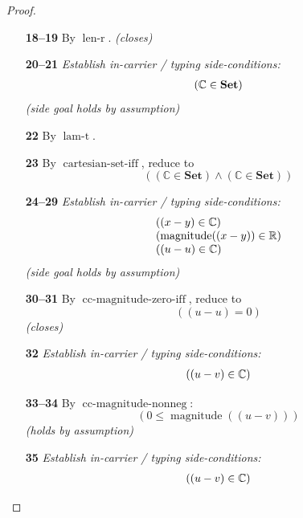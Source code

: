 \documentclass[11pt]{article}
\theoremstyle{plain}
\begin{document}
\begin{proof}
\begin{itemize}[leftmargin=2.8em, itemsep=4pt, parsep=1pt]
  \item[\textbf{18--19}] By $\operatorname{len\text{-}r}$.  \emph{(closes)}
  \item[\textbf{20--21}] \emph{Establish in-carrier / typing side-conditions:}
\begin{equation*}
\begin{array}{@{}l@{}}
(\mathbb{C} \in \mathbf{Set})
\end{array}
\end{equation*}
  \emph{(side goal holds by assumption)}
  \item[\textbf{22}] By $\operatorname{lam\text{-}t}$.
  \item[\textbf{23}] By $\operatorname{cartesian\text{-}set\text{-}iff}$, reduce to
\begin{equation*}
((\mathbb{C} \in \mathbf{Set}) \wedge (\mathbb{C} \in \mathbf{Set}))
\end{equation*}

  \item[\textbf{24--29}] \emph{Establish in-carrier / typing side-conditions:}
\begin{equation*}
\begin{array}{@{}l@{}}
((x - y) \in \mathbb{C}) \\
(\operatorname{magnitude}((x - y)) \in \mathbb{R}) \\
((u - u) \in \mathbb{C})
\end{array}
\end{equation*}
  \emph{(side goal holds by assumption)}
  \item[\textbf{30--31}] By $\operatorname{cc\text{-}magnitude\text{-}zero\text{-}iff}$, reduce to
\begin{equation*}
((u - u) = 0)
\end{equation*}
  \emph{(closes)}
  \item[\textbf{32}] \emph{Establish in-carrier / typing side-conditions:}
\begin{equation*}
\begin{array}{@{}l@{}}
((u - v) \in \mathbb{C})
\end{array}
\end{equation*}

  \item[\textbf{33--34}] By $\operatorname{cc\text{-}magnitude\text{-}nonneg}$:
\begin{equation*}
(0 \leq \operatorname{magnitude}((u - v)))
\end{equation*}
  \emph{(holds by assumption)}
  \item[\textbf{35}] \emph{Establish in-carrier / typing side-conditions:}
\begin{equation*}
\begin{array}{@{}l@{}}
((u - v) \in \mathbb{C})
\end{array}
\end{equation*}


\end{itemize}
\end{proof}
\end{document}
